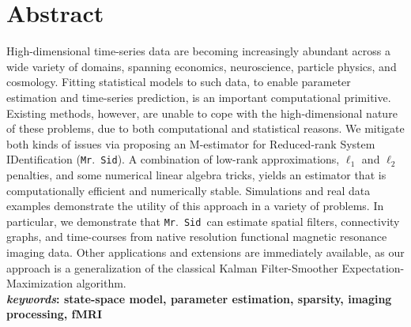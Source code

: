 \documentclass[fleqn,12pt]{article}
\newcommand{\mrsid}{{\sc \texttt{Mr}.~\texttt{Sid}}}
\begin{document}
\section*{Abstract}
High-dimensional time-series data are becoming increasingly abundant across a wide variety of domains, spanning economics, neuroscience,  particle physics, and cosmology.  Fitting statistical models to such data, to enable parameter estimation and time-series prediction, is an important computational primitive.
Existing methods, however, are unable to cope with the high-dimensional nature of these problems, due to both computational and statistical reasons.  We mitigate both kinds of issues via proposing an M-estimator for Reduced-rank System IDentification (\mrsid). A combination of low-rank approximations, $\ell_1$ and $\ell_2$ penalties, and some numerical linear algebra tricks, yields an estimator that is computationally efficient and numerically stable.  Simulations and real data examples demonstrate the utility of this approach in a variety of problems.  In particular, we demonstrate that \mrsid~can estimate spatial filters, connectivity graphs, and time-courses from native resolution functional magnetic resonance imaging data.  Other applications and extensions are immediately available, as our approach is a generalization of the classical Kalman Filter-Smoother Expectation-Maximization algorithm.
\\
\textbf{\emph{keywords}: state-space model, parameter estimation, sparsity, imaging processing, fMRI}
\end{document}
